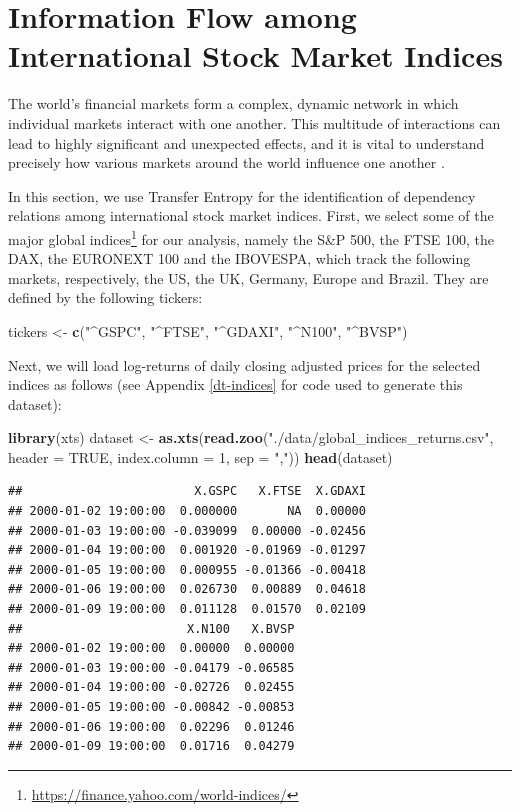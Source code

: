 \documentclass[]{book}
\newenvironment{Shaded}{\begin{snugshade}}{\end{snugshade}}
\newcommand{\KeywordTok}[1]{\textcolor[rgb]{0.13,0.29,0.53}{\textbf{#1}}}
\newcommand{\DataTypeTok}[1]{\textcolor[rgb]{0.13,0.29,0.53}{#1}}
\newcommand{\DecValTok}[1]{\textcolor[rgb]{0.00,0.00,0.81}{#1}}
\newcommand{\StringTok}[1]{\textcolor[rgb]{0.31,0.60,0.02}{#1}}
\newcommand{\OtherTok}[1]{\textcolor[rgb]{0.56,0.35,0.01}{#1}}
\newcommand{\NormalTok}[1]{#1}
\DeclareRobustCommand{\href}[2]{#2\footnote{\url{#1}}}
\theoremstyle{definition}
\theoremstyle{definition}
\theoremstyle{definition}
\theoremstyle{remark}
\begin{document}
\section{Information Flow among International Stock Market
Indices}\label{information-flow-among-international-stock-market-indices}

The world's financial markets form a complex, dynamic network in which
individual markets interact with one another. This multitude of
interactions can lead to highly significant and unexpected effects, and
it is vital to understand precisely how various markets around the world
influence one another \citep{junior2015dependency}.

In this section, we use Transfer Entropy for the identification of
dependency relations among international stock market indices. First, we
select some of the \href{https://finance.yahoo.com/world-indices/}{major
global indices} for our analysis, namely the S\&P 500, the FTSE 100, the
DAX, the EURONEXT 100 and the IBOVESPA, which track the following
markets, respectively, the US, the UK, Germany, Europe and Brazil. They
are defined by the following tickers:

\begin{Shaded}
\begin{Highlighting}[]
\NormalTok{tickers <-}\StringTok{ }\KeywordTok{c}\NormalTok{(}\StringTok{"^GSPC"}\NormalTok{, }\StringTok{"^FTSE"}\NormalTok{, }\StringTok{"^GDAXI"}\NormalTok{, }\StringTok{"^N100"}\NormalTok{, }\StringTok{"^BVSP"}\NormalTok{)}
\end{Highlighting}
\end{Shaded}

Next, we will load log-returns of daily closing adjusted prices for the
selected indices as follows (see Appendix \ref{dt-indices} for code used
to generate this dataset):

\begin{Shaded}
\begin{Highlighting}[]
\KeywordTok{library}\NormalTok{(xts)}
\NormalTok{dataset <-}\StringTok{ }\KeywordTok{as.xts}\NormalTok{(}\KeywordTok{read.zoo}\NormalTok{(}\StringTok{"./data/global_indices_returns.csv"}\NormalTok{, }
  \DataTypeTok{header =} \OtherTok{TRUE}\NormalTok{, }\DataTypeTok{index.column =} \DecValTok{1}\NormalTok{, }\DataTypeTok{sep =} \StringTok{","}\NormalTok{))}
\KeywordTok{head}\NormalTok{(dataset)}
\end{Highlighting}
\end{Shaded}

\begin{verbatim}
##                        X.GSPC   X.FTSE  X.GDAXI
## 2000-01-02 19:00:00  0.000000       NA  0.00000
## 2000-01-03 19:00:00 -0.039099  0.00000 -0.02456
## 2000-01-04 19:00:00  0.001920 -0.01969 -0.01297
## 2000-01-05 19:00:00  0.000955 -0.01366 -0.00418
## 2000-01-06 19:00:00  0.026730  0.00889  0.04618
## 2000-01-09 19:00:00  0.011128  0.01570  0.02109
##                       X.N100   X.BVSP
## 2000-01-02 19:00:00  0.00000  0.00000
## 2000-01-03 19:00:00 -0.04179 -0.06585
## 2000-01-04 19:00:00 -0.02726  0.02455
## 2000-01-05 19:00:00 -0.00842 -0.00853
## 2000-01-06 19:00:00  0.02296  0.01246
## 2000-01-09 19:00:00  0.01716  0.04279
\end{verbatim}
\end{document}
